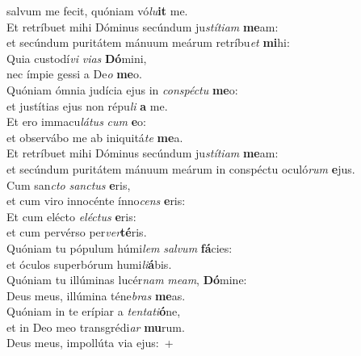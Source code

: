 \evenverse salvum me fecit, quóniam vó\textit{lu}\textbf{it} me.\\
\oddverse Et retríbuet mihi Dóminus secúndum ju\textit{stí}\textit{ti}\textit{am} \textbf{me}am:~\*\\
\oddverse et secúndum puritátem mánuum meárum retríbu\textit{et} \textbf{mi}hi:\\
\evenverse Quia custodí\textit{vi} \textit{vi}\textit{as} \textbf{Dó}mini,~\*\\
\evenverse nec ímpie gessi a De\textit{o} \textbf{me}o.\\
\oddverse Quóniam ómnia judícia ejus in \textit{con}\textit{spé}\textit{ctu} \textbf{me}o:~\*\\
\oddverse et justítias ejus non répu\textit{li} \textbf{a} me.\\
\evenverse Et ero immacu\textit{lá}\textit{tus} \textit{cum} \textbf{e}o:~\*\\
\evenverse et observábo me ab iniquitá\textit{te} \textbf{me}a.\\
\oddverse Et retríbuet mihi Dóminus secúndum ju\textit{stí}\textit{ti}\textit{am} \textbf{me}am:~\*\\
\oddverse et secúndum puritátem mánuum meárum in conspéctu oculó\textit{rum} \textbf{e}jus.\\
\evenverse Cum san\textit{cto} \textit{san}\textit{ctus} \textbf{e}ris,~\*\\
\evenverse et cum viro innocénte ínno\textit{cens} \textbf{e}ris:\\
\oddverse Et cum elécto \textit{e}\textit{lé}\textit{ctus} \textbf{e}ris:~\*\\
\oddverse et cum pervérso per\textit{ver}\textbf{té}ris.\\
\evenverse Quóniam tu pópulum húmi\textit{lem} \textit{sal}\textit{vum} \textbf{fá}cies:~\*\\
\evenverse et óculos superbórum humi\textit{li}\textbf{á}bis.\\
\oddverse Quóniam tu illúminas lucér\textit{nam} \textit{me}\textit{am}, \textbf{Dó}mine:~\*\\
\oddverse Deus meus, illúmina téne\textit{bras} \textbf{me}as.\\
\evenverse Quóniam in te erípiar a \textit{ten}\textit{ta}\textit{ti}\textbf{ó}ne,~\*\\
\evenverse et in Deo meo transgrédi\textit{ar} \textbf{mu}rum.\\
\oddverse Deus meus, impollúta via ejus:~+\\
